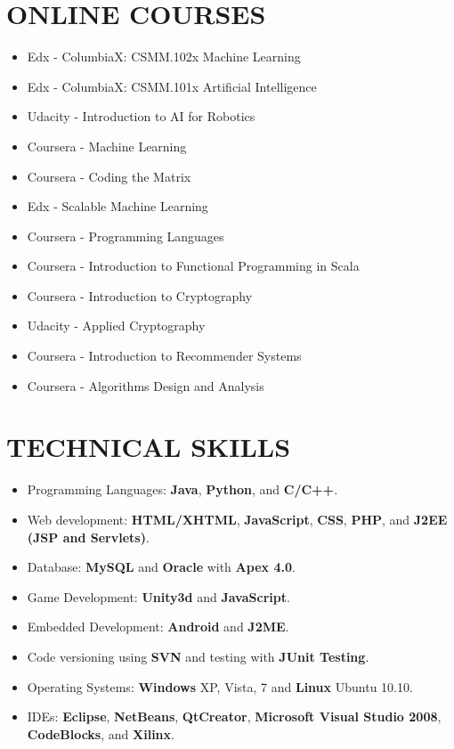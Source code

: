 \documentclass{res}
\begin{document}
\begin{resume}
\section{ONLINE COURSES \footnotemark } 
	\begin{itemize}
	\item Edx - ColumbiaX: CSMM.102x Machine Learning
	\item Edx - ColumbiaX: CSMM.101x Artificial Intelligence
	\item Udacity - Introduction to AI for Robotics
	\item Coursera - Machine Learning
	\item Coursera - Coding the Matrix
	\item Edx - Scalable Machine Learning
	\item Coursera - Programming Languages
	\item Coursera - Introduction to Functional Programming in Scala
	\item Coursera - Introduction to Cryptography
	\item Udacity - Applied Cryptography
	\item Coursera - Introduction to Recommender Systems
	\item Coursera - Algorithms Design and Analysis
	\end{itemize}	 

\section{TECHNICAL SKILLS}       
	\begin{itemize}   
    \item Programming Languages: \textbf{Java}, \textbf{Python}, and \textbf{C/C++}.
 	\item Web development: \textbf{HTML/XHTML}, \textbf{JavaScript}, \textbf{CSS}, \textbf{PHP}, and \textbf{J2EE (JSP and Servlets)}.
	\item Database: \textbf{MySQL} and \textbf{Oracle} with \textbf{Apex 4.0}.
	\item Game Development: \textbf{Unity3d} and \textbf{JavaScript}.
	\item Embedded Development: \textbf{Android} and \textbf{J2ME}.
	\item Code versioning using \textbf{SVN} and testing with \textbf{JUnit Testing}.
	\item Operating Systems: \textbf{Windows} XP, Vista, 7 and \textbf{Linux} Ubuntu 10.10.
	\item IDEs: \textbf{Eclipse}, \textbf{NetBeans}, \textbf{QtCreator}, \textbf{Microsoft Visual Studio 2008}, \textbf{CodeBlocks}, and \textbf{Xilinx}.  
	\end{itemize}       
 

\end{resume}
\end{document}
